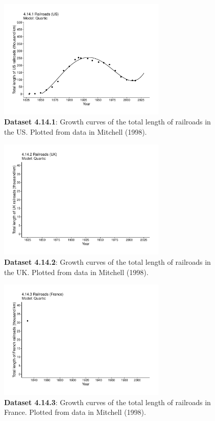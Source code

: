 \documentclass[aps,rmp,preprint,superscriptaddress,10pt,onecolumn]{article}
\begin{document}
\begin{figure}[h]
\includegraphics[width=8cm]{output/figs-ggplot/4.14.1.pdf}
\caption{\textbf{Dataset 4.14.1}: Growth curves of the total length of railroads in the US. Plotted from data in Mitchell (1998).}
\end{figure}
	
\begin{figure}[h]
\includegraphics[width=8cm]{output/figs-ggplot/4.14.2.pdf}
\caption{\textbf{Dataset 4.14.2}: Growth curves of the total length of railroads in the UK. Plotted from data in Mitchell (1998).}
\end{figure}
	
\begin{figure}[h]
\includegraphics[width=8cm]{output/figs-ggplot/4.14.3.pdf}
\caption{\textbf{Dataset 4.14.3}: Growth curves of the total length of railroads in France. Plotted from data in Mitchell (1998).}
\end{figure}
	
\end{document}

